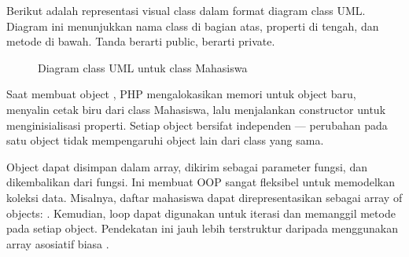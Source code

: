 Berikut adalah representasi visual class  dalam format diagram class UML. Diagram ini menunjukkan nama class di bagian atas, properti di tengah, dan metode di bawah. Tanda \code{+} berarti public, \code{-} berarti private.

\begin{figure}[ht]
\centering
{}
\caption{Diagram class UML untuk class Mahasiswa}
\end{figure}

\begin{contoh}
Saat membuat object , PHP mengalokasikan memori untuk object baru, menyalin cetak biru dari class Mahasiswa, lalu menjalankan constructor untuk menginisialisasi properti. Setiap object bersifat independen --- perubahan pada satu object tidak mempengaruhi object lain dari class yang sama.
\end{contoh}

Object dapat disimpan dalam array, dikirim sebagai parameter fungsi, dan dikembalikan dari fungsi. Ini membuat OOP sangat fleksibel untuk memodelkan koleksi data. Misalnya, daftar mahasiswa dapat direpresentasikan sebagai array of objects: . Kemudian, loop  dapat digunakan untuk iterasi dan memanggil metode pada setiap object. Pendekatan ini jauh lebih terstruktur daripada menggunakan array asosiatif biasa \cite{phpRightWay}.

